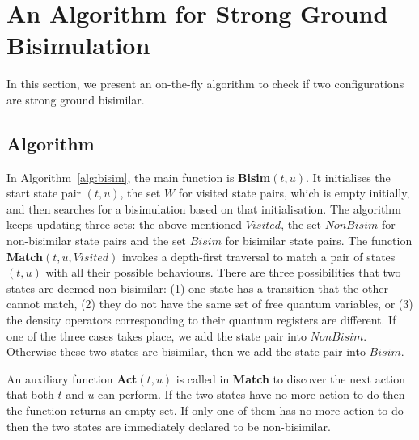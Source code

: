 \documentclass[a4paper,runningheads]{llncs}
\begin{document}
\appendix
\section{An Algorithm for Strong Ground Bisimulation}
\label{sec:strong_bisim}
In this section, we present an on-the-fly algorithm to check if two configurations are strong ground bisimilar.
\subsection{Algorithm}\label{sec:strong_bisim_alg}
In Algorithm~\ref{alg:bisim}, the main function is \textbf{Bisim}$(t,u)$. It initialises the start state pair $(t,u)$, the set $W$ for visited state pairs, which is empty initially, and then searches for a bisimulation based on that initialisation. 
The algorithm keeps updating three sets: the above mentioned $Visited$, the set $NonBisim$ for non-bisimilar state pairs and the set $Bisim$ for bisimilar state pairs. The function \textbf{Match}$(t,u,Visited)$ invokes a depth-first traversal to match a pair of 
states $(t,u)$ with all their possible behaviours. There are three possibilities that two states are deemed non-bisimilar:  (1) one state has a transition that the other cannot match, (2) they do not have the same set of free quantum variables, or (3) the density operators corresponding to their quantum registers are different. If one of the three cases takes place, we add the state pair into $NonBisim$. Otherwise these two states are bisimilar, then we add the state pair into $Bisim$.

An auxiliary function \textbf{Act}$(t,u)$ is called in \textbf{Match} to discover the next action that both $t$ and $u$ can perform. If the two states have no more action to do then the function returns an empty set. If only one of them has no more action to do then the two states are immediately declared to be non-bisimilar. 
\end{document}
